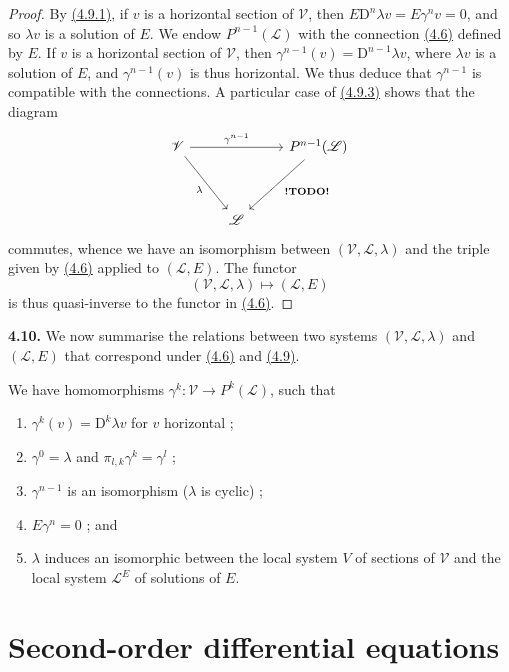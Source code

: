 \documentclass{report}
\newenvironment{rmenv}[1]
  {\phantomsection\par\medskip\noindent\textbf{#1.}\rmfamily}
  {\medskip}
\newcommand{\scr}[1]{{\mathscr{#1}}}
\newcommand{\DD}{\mathrm{D}}
\newcommand{\todo}{\textbf{ !TODO! }}
\newcommand{\oldpage}[1]{\marginpar{\footnotesize$\Big\vert$ \textit{p.~#1}}}
\begin{document}
\begin{proof}
  By \hyperref[I.4.9.1]{(4.9.1)}, if $v$ is a horizontal section of $\scr{V}$, then $E\DD^n\lambda v = E\gamma^n v = 0$, and so $\lambda v$ is a solution of $E$.
  We endow $P^{n-1}(\scr{L})$ with the connection \hyperref[I.4.6]{(4.6)} defined by $E$.
  If $v$ is a horizontal section of $\scr{V}$, then $\gamma^{n-1}(v)=\DD^{n-1}\lambda v$, where $\lambda v$ is a solution of $E$, and $\gamma^{n-1}(v)$ is thus horizontal.
  We thus deduce that $\gamma^{n-1}$ is compatible with the connections.
  A particular case of \hyperref[I.4.9.3]{(4.9.3)} shows that the diagram
  \[
    \begin{tikzcd}[row sep=huge]
      \scr{V} \ar[rr,"\gamma^{n-1}"] \drar[swap,"\lambda"]
      && P^{n-1}(\scr{L}) \dlar["\todo"]
    \\&\scr{L}&
    \end{tikzcd}
  \]
  commutes, whence we have an isomorphism between $(\scr{V},\scr{L},\lambda)$ and the triple given by \hyperref[I.4.6]{(4.6)} applied to $(\scr{L},E)$.
  The functor
  \[
    (\scr{V},\scr{L},\lambda) \mapsto (\scr{L},E)
  \]
  is thus quasi-inverse to the functor in \hyperref[I.4.6]{(4.6)}.
\end{proof}

\begin{rmenv}{4.10}
\label{I.4.10}
  We now summarise the relations between two systems $(\scr{V},\scr{L},\lambda)$ and $(\scr{L},E)$ that correspond under \hyperref[I.4.6]{(4.6)} and \hyperref[I.4.9]{(4.9)}.

  We have homomorphisms $\gamma^k\colon\scr{V}\to P^k(\scr{L})$, such that
  \begin{enumerate}
    \item[(4.10.1)]\label{I.4.10.1}
      $\gamma^k(v) = \DD^k\lambda v$ for $v$ horizontal ;
\oldpage{29}
    \item[(4.10.2)]\label{I.4.10.2}
      $\gamma^0=\lambda$ and $\pi_{l,k}\gamma^k=\gamma^l$ ;
    \item[(4.10.3)]\label{I.4.10.3}
      $\gamma^{n-1}$ is an isomorphism ($\lambda$ is cyclic) ;
    \item[(4.10.4)]\label{I.4.10.4}
      $E\gamma^n=0$ ; and
    \item[(4.10.5)]\label{I.4.10.5}
      $\lambda$ induces an isomorphic between the local system $V$ of sections of $\scr{V}$ and the local system $\scr{L}^E$ of solutions of $E$.
  \end{enumerate}
\end{rmenv}


\section{Second-order differential equations}
\label{I.5}
\end{document}
